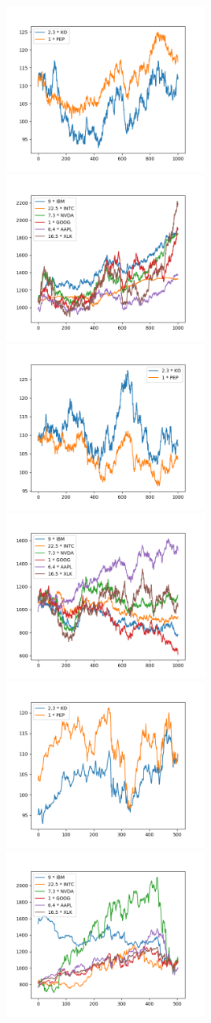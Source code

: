 \documentclass[12pt]{article}
\begin{document}
\includegraphics[width=0.5\textwidth]{Teil1_1}	
\includegraphics[width=0.5\textwidth]{Teil2_1}
\includegraphics[width=0.5\textwidth]{Teil1_2}	
\includegraphics[width=0.5\textwidth]{Teil2_2}
\includegraphics[width=0.5\textwidth]{Teil1_hist_2y}	
\includegraphics[width=0.5\textwidth]{Teil2_hist_2y}	
\end{document}
